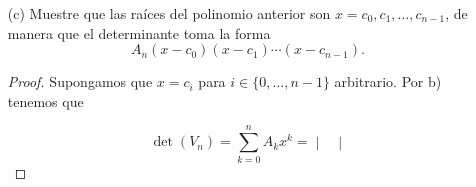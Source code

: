 \documentclass[11pt]{article}
\theoremstyle{definition} %
\begin{document}
\begin{enumerate}
\begin{proof}
\[\begin{vmatrix}
    \vdots \\

    c_{n-1} &\dots & c_{n-1}^n

\end{vmatrix} + x\cdot(-1)^{n+3}\begin{vmatrix}

    1 & c_0^2 & \dots & c_0^n \\

    1 \\

    \vdots \\

    1 & c_{n-1}^2 & \dots & c_{n-1}^n

\end{vmatrix} + \dots x^n\cdot(-1)^{2n+2}\begin{vmatrix}

    1 & \dots & c_0^{n-1} \\

    \vdots \\

    1 & \dots & c_{n-1}^{n-1}

\end{vmatrix}
\]

Como sumar 2 a un número natural no altera su paridad, podemos restar 2 al exponente de $(-1)$ en cada termino, de la suma. Esto nos permite reescribir el determinante como

\[
\det(V_n)=\sum_{k=0}^n A_kx^k = A_0 + A_1x+\dots + A_nx^n
\]

donde definimos $A_k$ como

\[
A_k := (-1)^{n+k} \cdot \det(M)
\]

con $M$ la submatriz de $V_n$ resultante al eliminar la $(n+1)$-ésima fila y $(k+1)$-ésima columna. Este es un polinomio de grado $n$ donde cada coeficiente $A_k$ depende de los valores de $c_0,\dots,c_n-1$.



  \end{proof}
  \item[(c)] Muestre que las raíces del polinomio anterior son \(x=c_0,c_1,\dots,c_{n-1}\), de manera que el determinante toma la forma
  \[
    A_n (x-c_0)(x-c_1)\cdots(x-c_{n-1}).
  \]
  \begin{proof}
    Supongamos que $x = c_i$ para $i \in \{0,\dots,n-1\}$ arbitrario. Por b) tenemos que

\[
\det(V_n) = \sum_{k=0}^n A_kx^k = \begin{vmatrix}


\end{vmatrix}\]
\end{proof}
\end{enumerate}
\end{document}
